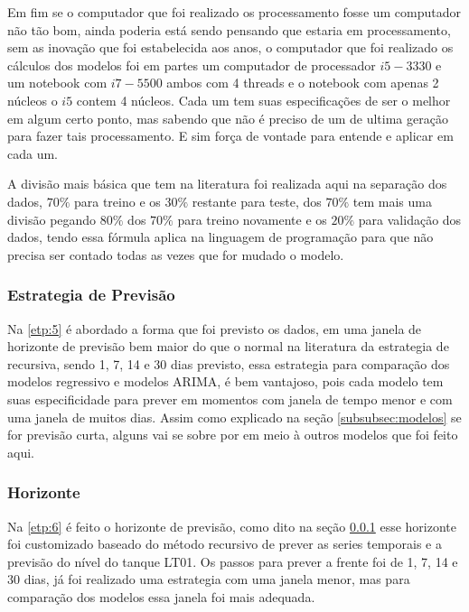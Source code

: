 Em fim se o computador que foi realizado os processamento fosse um computador não tão bom, ainda poderia está sendo pensando que estaria em processamento, sem as inovação que foi estabelecida aos anos, o computador que foi realizado os cálculos dos modelos foi em partes um computador de processador $i5-3330$ e um notebook com $i7-5500$ ambos com 4 threads e o notebook com apenas 2 núcleos o $i5$ contem 4 núcleos. Cada um tem suas especificações de ser o melhor em algum certo ponto, mas sabendo que não é preciso de um de ultima geração para fazer tais processamento. E sim força de vontade para entende e aplicar em cada um.

A divisão mais básica que tem na literatura foi realizada aqui na separação dos dados, $70\%$ para treino e os $30\%$ restante para teste, dos $70\%$ tem mais uma divisão pegando $80\%$ dos $70\%$ para treino novamente e os $20\%$ para validação dos dados, tendo essa fórmula aplica na linguagem de programação para que não precisa ser contado todas as vezes que for mudado o modelo.

\subsubsection{Estrategia de Previs\~ao}\label{subsubsec:est}

Na \ref{etp:5} é abordado a forma que foi previsto os dados, em uma janela de horizonte de previsão bem maior do que o normal na literatura da estrategia de recursiva, sendo 1, 7, 14 e 30 dias previsto, essa estrategia para comparação dos modelos regressivo e modelos ARIMA, é bem vantajoso, pois cada modelo tem suas especificidade para prever em momentos com janela de tempo menor e com uma janela de muitos dias. Assim como explicado na seção \ref{subsubsec:modelos} se for previsão curta, alguns vai se sobre por em meio à outros modelos que foi feito aqui.

\subsubsection{Horizonte}

Na \ref{etp:6} é feito o horizonte de previsão, como dito na seção \ref{subsubsec:est} esse horizonte foi customizado baseado do método recursivo de prever as series temporais e a previsão do nível do tanque LT01. Os passos para prever a frente foi de 1, 7, 14 e 30 dias, já foi realizado uma estrategia com uma janela menor, mas para comparação dos modelos essa janela foi mais adequada.

